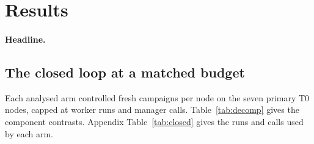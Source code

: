 \section{Results}
\label{sec:results}

\ifLoopOutcomeSet\else
{}
\fi
\ifGateOutcomeSet\else
{}
\fi

\paragraph{Headline.}
\ifLoopOutcomeSet
  \ifRuleGain
    \ReadingRuleAttribution
    \ifLearnedNotRun\ReadingLearnedStopped
    \else\ifLearnedGain\ReadingLearnedForGate\else\ReadingRuleForGate\fi\fi
  \else
    \ReadingNegative
    \ifLearnedNotRun\space\ReadingLearnedStopped\fi
  \fi
\else
{}
\ReadingLearnedForGate
\fi

\subsection{The closed loop at a matched budget}
\label{sec:results-closed}

Each analysed arm controlled \LoopInstances{} fresh campaigns per node on the seven primary T0 nodes, capped at \LoopW{} worker runs and \LoopCalls{} manager calls. Table~\ref{tab:decomp} gives the component contrasts. Appendix Table~\ref{tab:closed} gives the runs and calls used by each arm.

